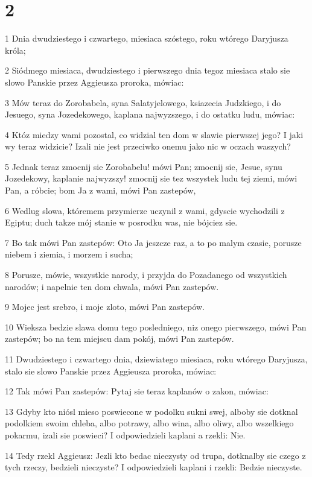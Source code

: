 \chapter{2}

\par 1 Dnia dwudziestego i czwartego, miesiaca szóstego, roku wtórego Daryjusza króla;
\par 2 Siódmego miesiaca, dwudziestego i pierwszego dnia tegoz miesiaca stalo sie slowo Panskie przez Aggieusza proroka, mówiac:
\par 3 Mów teraz do Zorobabela, syna Salatyjelowego, ksiazecia Judzkiego, i do Jesuego, syna Jozedekowego, kaplana najwyzszego, i do ostatku ludu, mówiac:
\par 4 Któz miedzy wami pozostal, co widzial ten dom w slawie pierwszej jego? I jaki wy teraz widzicie? Izali nie jest przeciwko onemu jako nic w oczach waszych?
\par 5 Jednak teraz zmocnij sie Zorobabelu! mówi Pan; zmocnij sie, Jesue, synu Jozedekowy, kaplanie najwyzszy! zmocnij sie tez wszystek ludu tej ziemi, mówi Pan, a róbcie; bom Ja z wami, mówi Pan zastepów,
\par 6 Wedlug slowa, któremem przymierze uczynil z wami, gdyscie wychodzili z Egiptu; duch takze mój stanie w posrodku was, nie bójciez sie.
\par 7 Bo tak mówi Pan zastepów: Oto Ja jeszcze raz, a to po malym czasie, porusze niebem i ziemia, i morzem i sucha;
\par 8 Porusze, mówie, wszystkie narody, i przyjda do Pozadanego od wszystkich narodów; i napelnie ten dom chwala, mówi Pan zastepów.
\par 9 Mojec jest srebro, i moje zloto, mówi Pan zastepów.
\par 10 Wieksza bedzie slawa domu tego posledniego, niz onego pierwszego, mówi Pan zastepów; bo na tem miejscu dam pokój, mówi Pan zastepów.
\par 11 Dwudziestego i czwartego dnia, dziewiatego miesiaca, roku wtórego Daryjusza, stalo sie slowo Panskie przez Aggieusza proroka, mówiac:
\par 12 Tak mówi Pan zastepów: Pytaj sie teraz kaplanów o zakon, mówiac:
\par 13 Gdyby kto niósl mieso poswiecone w podolku sukni swej, alboby sie dotknal podolkiem swoim chleba, albo potrawy, albo wina, albo oliwy, albo wszelkiego pokarmu, izali sie poswieci? I odpowiedzieli kaplani a rzekli: Nie.
\par 14 Tedy rzekl Aggieusz: Jezli kto bedac nieczysty od trupa, dotknalby sie czego z tych rzeczy, bedzieli nieczyste? I odpowiedzieli kaplani i rzekli: Bedzie nieczyste.

